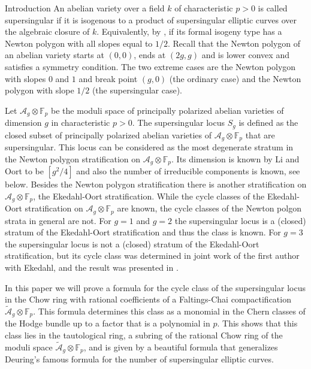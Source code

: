 \documentclass[11pt]{amsart}
\numberwithin{equation}{section}
\def\today{\ifcase\month\or Jan\or Febr\or  Mar\or  Apr\or May\or Jun\or  Jul\or Aug\or  Sep\or  Oct\or Nov\or  Dec\or\fi \space\number\day, \number\year}
\newcommand{\FF}{\mathbb F}
\newcommand{\A}{\mathcal A}
\theoremstyle{definition}
\theoremstyle{remark}
\begin{document}
\maketitle
\begin{section}{Introduction}
An abelian variety over a field $k$ of characteristic $p>0$ is called supersingular
if it is isogenous to a product of supersingular elliptic curves over
the algebraic closure of $k$. Equivalently, by \cite[Thm.\ 4.2]{Oort1974}, 
if its formal isogeny type
has a Newton polygon with all slopes equal to $1/2$.  Recall that the
Newton
polygon of an abelian variety starts at $(0,0)$, ends at $(2g,g)$ and
is lower convex and satisfies a symmetry condition. The two extreme cases
are the Newton polygon with slopes $0$ and $1$ and break point $(g,0)$ (the ordinary
case) and the Newton polygon with slope $1/2$ (the supersingular case).

Let ${\A}_g \otimes {\FF}_p$ be the moduli space of principally polarized
abelian varieties of dimension $g$ in characteristic $p>0$.
The supersingular locus $S_g$ is defined as the closed subset of principally
polarized abelian varieties of ${\A}_g\otimes {\FF}_p$ that are supersingular.
This locus can be considered as the most degenerate stratum in the Newton
polygon stratification on ${\A}_g \otimes {\FF}_p$. Its dimension is known
by Li and Oort to be $[g^2/4]$ 
and also the number of irreducible components is
known, see below. Besides the Newton polygon stratification there is another
stratification on $\mathcal{A}_g\otimes {\FF}_p$, the Ekedahl-Oort 
stratification. While the cycle classes of the Ekedahl-Oort stratification
on ${\A}_g \otimes {\FF}_p$ are known, the cycle classes of the Newton polgon
strata in general are not. For $g=1$ and $g=2$ the supersingular locus
is a (closed) stratum of the Ekedahl-Oort stratification and thus the class is known.
For $g=3$ the supersingular locus is not a (closed) 
stratum of the Ekedahl-Oort stratification, 
but its cycle class was determined in joint work of the first
author with Ekedahl, and the result was presented in \cite{vdG1}.

In this paper we will prove a formula for the cycle class of the 
supersingular locus in the Chow ring with rational coefficients
of a Faltings-Chai
compactification $\tilde{\mathcal{A}}_g\otimes {\FF}_p$.
This formula determines this class as a monomial in the
Chern classes of the Hodge bundle 
up to a factor that is a polynomial in $p$. 
This shows that this class lies in the tautological ring, a subring of the
rational Chow ring  of the moduli space
$\tilde{\mathcal{A}}_g \otimes {\FF}_p$, 
and is given by a beautiful formula
that generalizes Deuring's famous formula for the number of supersingular elliptic curves.


\end{section}
\end{document}
